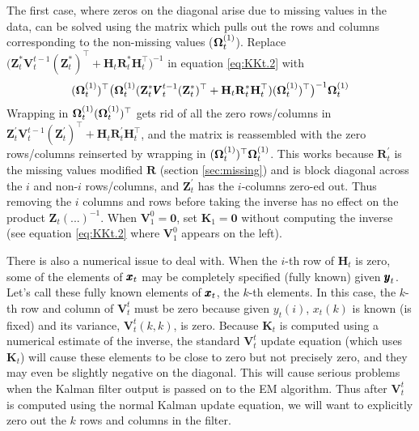 \documentclass[]{article}
\def\OMG{\mbox{\boldmath $\Omega$}}
\def\ZZ{\mbox{$\mathbf Z$}}	\def\zz{\mbox{$\mathbf z$}}
\def\HH{\mbox{$\mathbf H$}}	\def\hh{\mbox{$\mathbf h$}}
\def\KK{\mbox{$\mathbf K$}}
\def\RR{\mbox{$\mathbf R$}}	 \def\rr{\mbox{$\mathbf r$}}
\def\VV{\mbox{$\pmb{V}$}}	\def\vv{\mbox{$\pmb{v}$}}
\begin{document}
The first case, where zeros on the diagonal arise due to missing values in the data, can be solved using the  matrix which pulls out the rows and columns corresponding to the non-missing values ($\OMG_t^{(1)}$).  Replace $\big(\ZZ_t^*\VV_t^{t-1}(\ZZ_t^*)^\top + \HH_t\RR_t^*\HH_t^\top\big)^{-1}$ in equation \ref{eq:KKt.2} with
\begin{equation}
(\OMG_t^{(1)})^\top\big(\OMG_t^{(1)}(\ZZ_t^*\VV_t^{t-1}(\ZZ_t^*)^\top + \HH_t\RR_t^*\HH_t^\top)(\OMG_t^{(1)})^\top\big)^{-1}\OMG_t^{(1)}
\end{equation}
Wrapping in $\OMG_t^{(1)}(\OMG_t^{(1)})^\top$ gets rid of all the zero rows/columns in $\ZZ_t^\prime\VV_t^{t-1}(\ZZ_t^\prime)^\top + \HH_t\RR_t^\prime\HH_t^\top$, and the matrix is reassembled with the zero rows/columns reinserted by wrapping in $(\OMG_t^{(1)})^\top\OMG_t^{(1)}$.  This works because $\RR_t^\prime$ is the missing values modified $\RR$ (section \ref{sec:missing}) and is block diagonal across the $i$ and non-$i$ rows/columns, and $\ZZ_t^\prime$ has the $i$-columns zero-ed out. Thus removing the $i$ columns and rows before taking the inverse has no effect on the product $\ZZ_t(...)^{-1}$. When $\VV_1^0=\mathbf{0}$, set $\KK_1=\mathbf{0}$ without computing the inverse (see equation \ref{eq:KKt.2} where $\VV_1^0$ appears on the left).

There is also a numerical issue to deal with.  When the $i$-th row of $\HH_t$ is zero, some of the elements of $\mbox{$\pmb{x}$}_t$ may be completely specified (fully known) given $\mbox{$\pmb{y}$}_t$.  Let's call these fully known elements of $\mbox{$\pmb{x}$}_t$, the $k$-th elements.  In this case, the $k$-th row and column of $\VV_t^t$ must be zero because given $y_t(i)$, $x_t(k)$ is known (is fixed) and its variance, $\VV_t^t(k,k)$, is zero.  Because  $\KK_t$ is computed using a numerical estimate of the inverse, the standard $\VV_t^t$ update equation (which uses $\KK_t$) will cause these elements to be close to zero but not precisely zero, and they may even be slightly negative on the diagonal. This will cause serious problems when the Kalman filter output is passed on to the EM algorithm. Thus after $\VV_t^t$ is computed using the normal Kalman update equation, we will want to explicitly zero out the $k$ rows and columns in the filter.  
\end{document}
